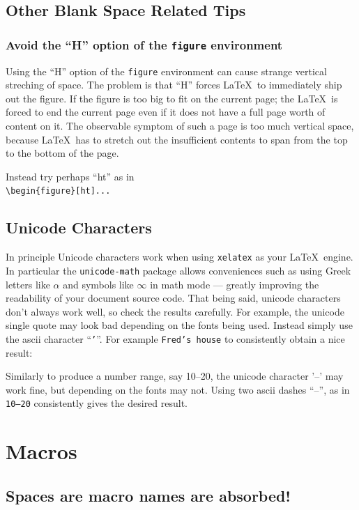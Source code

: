 \documentclass{article}
\newcommand*\𝚝[1]{\texttt{#1}}%
\begin{document}
\subsection*{Other Blank Space Related Tips}
\subsubsection*{Avoid the ``H'' option of the \𝚝{figure} environment}
Using the ``H'' option of the \𝚝{figure} environment can cause strange vertical streching of space.
The problem is that ``H'' forces \LaTeX\ to immediately ship out the figure.  If the figure is too big to
fit on the current page; the \LaTeX\ is forced to end the current page even if it does not have a full page
worth of content on it.  The observable symptom of such a page is too much vertical space, because \LaTeX\ has
to stretch out the insufficient contents to span from the top to the bottom of the page.

Instead try perhaps ``ht'' as in\\
\verb|\begin{figure}[ht]...|



\subsection*{Unicode Characters}
In principle Unicode characters work when using \𝚝{xelatex} as your \LaTeX\ engine.  In particular
the \𝚝{unicode-math} package allows conveniences such as using Greek letters like $α$ and symbols like $∞$ in
math mode --- greatly improving the readability of your document source code.
That being said, unicode characters don't always work well, so check the results carefully.
For example, the unicode single quote may look bad depending on the fonts being used.
Instead simply use the ascii character ``\𝚝{'}''. For example \𝚝{Fred's house}
to consistently obtain a nice result:
\begin{center}\end{center}

Similarly to produce a number range, say 10--20, the unicode character '–' may work fine, but
depending on the fonts may not.  Using two ascii dashes ``--'', as in \𝚝{10--20} consistently gives the desired result.


\section*{Macros}
\subsection*{Spaces are macro names are absorbed!}
\end{document}
